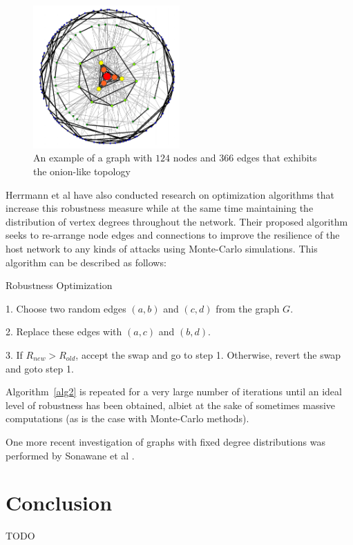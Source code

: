 \documentclass[doc]{apa}%
\begin{document}
\begin{figure}[h!]
	\label{fig:Onion}
	\centering
		\includegraphics[width=0.5\textwidth]{Onion.jpg}
	\caption{An example of a graph with $124$ nodes and $366$ edges that exhibits the onion-like topology } %
\end{figure}

Herrmann et al have also conducted research on optimization algorithms that increase this robustness measure while at the same time maintaining the distribution of vertex degrees throughout the network. Their proposed algorithm seeks to re-arrange node edges and connections to improve the resilience of the host network to any kinds of attacks using Monte-Carlo simulations. This algorithm can be described as follows:

\begin{algorithm}
\caption{Robustness Optimization}
\label{alg2}
\begin{algorithmic}
	\item 1. Choose two random edges $(a,b)$ and $(c,d)$ from the graph $G$.
	\item 2. Replace these edges with $(a,c)$ and $(b,d)$.
	\item 3. If $R_{new} > R_{old}$, accept the swap and go to step 1. Otherwise, revert the swap and goto step 1. 
\end{algorithmic}
\end{algorithm}

Algorithm~\ref{alg2} is repeated for a very large number of iterations until an ideal level of robustness has been obtained, albiet at the sake of sometimes massive computations (as is the case with Monte-Carlo methods).


One more recent investigation of graphs with fixed degree distributions was performed by Sonawane et al \cite{bimodal}. 

\section{Conclusion}
TODO


\end{document}
